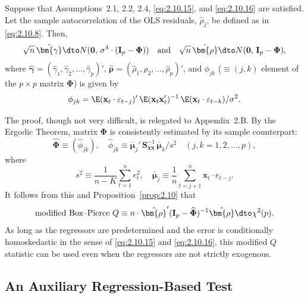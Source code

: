 \begin{proposition}
\label{prop:2.10}
Suppose that Assumptions~2.1, 2.2, 2.4, \eqref{eq:2.10.15}, and \eqref{eq:2.10.16}
are satisfied. Let the sample autocorrelation of the OLS residuals, $\hat{\rho}_j$,
be defined as in \eqref{eq:2.10.8}. Then,
%
\begin{equation}
\sqrt{n}\,\hat{\bm{\gamma}} \dto N(\mathbf{0},\,\sigma^4 \cdot (\mathbf{I}_p - \mathbf{\Phi}))
\quad \text{and} \quad
\sqrt{n}\,\hat{\bm{\rho}} \dto N(\mathbf{0},\,\mathbf{I}_p - \mathbf{\Phi}),
\label{eq:2.10.17}
\end{equation}
%
where
$\hat{\bm{\gamma}} = (\hat{\gamma}_1, \hat{\gamma}_2, \ldots, \hat{\gamma}_p)'$,
$\hat{\bm{\rho}} = (\hat{\rho}_1, \hat{\rho}_2, \ldots, \hat{\rho}_p)'$,
and $\phi_{jk}$ ($\equiv (j,k)$ element of the $p \times p$ matrix $\mathbf{\Phi}$) is given by
%
\begin{equation}
\phi_{jk} = \E(\mathbf{x}_t \cdot \varepsilon_{t-j})'\,
\E(\mathbf{x}_t\mathbf{x}_t')^{-1}\,
\E(\mathbf{x}_t \cdot \varepsilon_{t-k})/\sigma^2.
\label{eq:2.10.18}
\end{equation}
\end{proposition}

The proof, though not very difficult, is relegated to Appendix~2.B. By the Ergodic
Theorem, matrix $\mathbf{\Phi}$ is consistently estimated by its sample counterpart:
%
\begin{equation}
\widehat{\mathbf{\Phi}} \equiv (\hat{\phi}_{jk}), \quad
\hat{\phi}_{jk} \equiv \bar{\bm{\mu}}_j'\,\mathbf{S}_{\mathbf{xx}}^{-1}\,
\bar{\bm{\mu}}_k / s^2
\quad (j, k = 1, 2, \ldots, p),
\label{eq:2.10.19}
\end{equation}
%
where
\[
s^2 \equiv \frac{1}{n - K}\sum_{t=1}^{n} e_t^2, \quad
\bar{\bm{\mu}}_j \equiv \frac{1}{n}\sum_{t=j+1}^{n}\mathbf{x}_t \cdot e_{t-j}.
\]
%
It follows from this and Proposition~\ref{prop:2.10} that
%
\begin{equation}
\text{modified Box--Pierce } Q
\equiv n \cdot \hat{\bm{\rho}}'(\mathbf{I}_p - \widehat{\mathbf{\Phi}})^{-1}\hat{\bm{\rho}}
\dto \chi^2(p).
\label{eq:2.10.20}
\end{equation}
%
As long as the regressors are predetermined and the error is conditionally homoskedastic in the sense of \eqref{eq:2.10.15} and \eqref{eq:2.10.16}, this modified $Q$ statistic can be
used even when the regressors are not strictly exogenous.

\subsection*{An Auxiliary Regression-Based Test}

